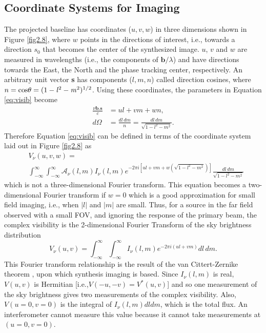 \subsection{Coordinate Systems for Imaging}\label{subsec:7}
The projected baseline has coordinates ($u,v,w$) in three dimensions shown in Figure \ref{fig2.8}, where $w$ points in the directions of interest, i.e., towards a direction \textbf{$s_{0}$} that becomes the center of the synthesized image. $u$, $v$ and $w$ are measured in wavelengths (i.e., the components of $\textbf{b}/\lambda$) and have directions towards the East, the North and the phase tracking center, respectively. An arbitrary unit vector \textbf{s} has components ($l,m,n$) called direction cosines, where $n=\rm{cos}\theta=(1-\mathit{l}^2-\mathit{m}^2)^{1/2}$. Using these coordinates, the parameters in Equation \ref{eq:visib} become
\begin{equation}
\begin{split}
\frac{\nu \textbf{b}.\textbf{s}}{c}&=ul+vm+wn, \\
d\Omega &= \frac{dl\,dm}{n}=\frac{dl\,dm}{\sqrt{1-l^2-m^2}}.
\end{split}
\end{equation}
Therefore Equation \ref{eq:visib} can be defined in terms of the coordinate system laid out in Figure \ref{fig2.8} as
\begin{equation}\label{eq:3-d_vis}
\begin{split}
&V_{\nu}(u,v,w)=\\
&\int ^{\infty}_{-\infty}\int ^{\infty}_{-\infty} \mathcal{A}_{\nu}(l,m)I_{\nu}(l,m)\mathit{e}^{-2\pi \mathit{i}[ul+vm+w(\sqrt{1-l^2-m^2})] }\frac{dl\,dm}{\sqrt{1-l^2-m^2}}
\end{split}
\end{equation}
which is not a three-dimensional Fourier transform. This equation becomes a two-dimensional Fourier transform if $w=0$ which is a good approximation for small field imaging, i.e., when $|l|$ and $|m|$ are small. Thus, for a source in the far field observed with a small FOV, and ignoring the response of the primary beam, the complex visibility  is the 2-dimensional Fourier Transform of the sky brightness distribution
\begin{equation}\label{eq:2-d_vis}
V_{\nu}(u,v)=\int ^{\infty}_{-\infty}\int ^{\infty}_{-\infty} I_{\nu}(l,m)\mathit{e}^{-2\pi \mathit{i}(ul+vm)}dl\,dm.
\end{equation}
This Fourier transform relationship is the result of the van Cittert-Zernike theorem \citep{van_cittert_1934}, upon which synthesis imaging is based. Since $I_{\nu}(l,m)$ is real, $V(u,v)$ is Hermitian [i.e.,$V(-u,-v) = V^{*}(u,v)$] and so one measurement of the sky brightness gives two measurements of the complex visibility. Also, $V(u=0,v=0)$ is the integral of $I_{\nu}(l,m)dldm$, which is the total flux. An interferometer cannot measure this value because it cannot take measurements at $(u=0,v=0)$. 

